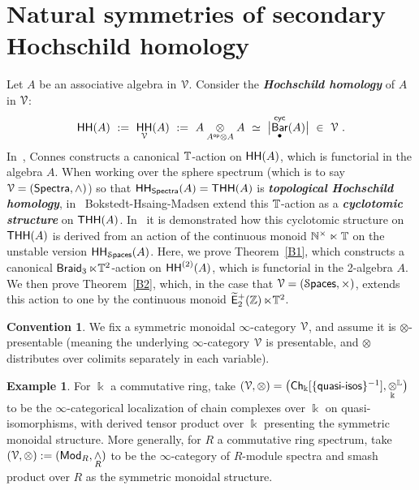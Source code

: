 \documentclass{amsart}
\theoremstyle{definition}
\newtheorem{example}[theorem]{Example}
\newtheorem*{conventions*}{Convention}
\theoremstyle{remark}
\DeclareMathOperator{\bBar}{\sf Bar}
\DeclareMathOperator{\Mod}{\sf Mod}
\newcommand{\bit}[1]{\textbf{\textit{#1}}}
\DeclareMathOperator{\op}{\mathsf{op}}
\DeclareMathOperator{\Spaces}{\cS\mathsf{paces}}
\def\ot{\otimes}
\newcommand{\w}{\widetilde}
\DeclareMathOperator{\Braid}{{\sf Braid}_3}
\DeclareMathOperator{\Ebraid}{\w{\sf E}_{2}^{+}(\ZZ)}
\DeclareMathOperator{\sHH}{\sf HH}
\begin{document}
\section{Natural symmetries of secondary Hochschild homology}

Let $A$ be an associative algebra in $\mathcal V$.  
Consider the \bit{Hochschild homology} of $A$ in $\mathcal V$:
\[
\sHH(A)
~:=~
\sHH_\cV(A) 
~:= ~
A \underset{ A^{\op}\ot A} \ot A
~\simeq~
\bigl|
\bBar_\bullet^{\sf cyc}(A)
\bigr|
~\in~ \cV
~.
\]
In~\cite{connes??}, Connes constructs a canonical $\mathbb T$-action on $\sHH(A)$, which is functorial in the algebra $A$.
When working over the sphere spectrum (which is to say $\mathcal V = ({\sf Spectra},\wedge)$) so that $\sHH_{\sf Spectra}(A) = {\sf THH}(A)$ is \bit{topological Hochschild homology}, in~\cite{??} Bokstedt-Hsaing-Madsen extend this $\mathbb T$-action as a \bit{cyclotomic structure} on ${\sf THH}(A)$.  
In~\cite{cyclo} it is demonstrated how this cyclotomic structure on ${\sf THH}(A)$ is derived from an action of the continuous monoid $\mathbb N^\times \ltimes \mathbb T$ on the unstable version $\sHH_{\Spaces}(A)$.
Here, we prove Theorem~\ref{B1}, which constructs a canonical $\Braid \ltimes \TT^2$-action on $\sHH^{(2)}(A)$, which is functorial in the 2-algebra $A$.  
We then prove Theorem~\ref{B2}, which, in the case that $\cV = (\Spaces,\times)$, extends this action to one by the continuous monoid $\Ebraid \ltimes \TT^2$.  





\begin{conventions*}
We fix a symmetric monoidal $\infty$-category $\mathcal V$, and assume it is $\ot$-presentable (meaning the underlying $\infty$-category $\mathcal V$ is presentable, and $\ot$ distributes over colimits separately in each variable).

\end{conventions*}

\begin{example}
For $\Bbbk$ a commutative ring, take $(\cV,\ot) = \bigl({\sf Ch}_\Bbbk[\{{\sf quasi\text{-}isos}\}^{-1}],\underset{\Bbbk}\otimes^{\LL}\bigr)$ to be the $\infty$-categorical localization of chain complexes over $\Bbbk$ on quasi-isomorphisms, with derived tensor product over $\Bbbk$ presenting the symmetric monoidal structure.
More generally, for $R$ a commutative ring spectrum, take $(\cV,\ot) := (\Mod_R,\underset{R}\wedge)$ to be the $\infty$-category of $R$-module spectra and smash product over $R$ as the symmetric monoidal structure.


\end{example}
\end{document}

